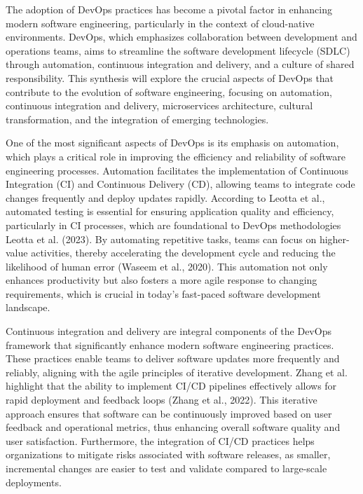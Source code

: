The adoption of DevOps practices has become a pivotal factor in enhancing modern software engineering, particularly in the context of cloud-native environments. DevOps, which emphasizes collaboration between development and operations teams, aims to streamline the software development lifecycle (SDLC) through automation, continuous integration and delivery, and a culture of shared responsibility. This synthesis will explore the crucial aspects of DevOps that contribute to the evolution of software engineering, focusing on automation, continuous integration and delivery, microservices architecture, cultural transformation, and the integration of emerging technologies.

One of the most significant aspects of DevOps is its emphasis on automation, which plays a critical role in improving the efficiency and reliability of software engineering processes. Automation facilitates the implementation of Continuous Integration (CI) and Continuous Delivery (CD), allowing teams to integrate code changes frequently and deploy updates rapidly. According to Leotta et al., automated testing is essential for ensuring application quality and efficiency, particularly in CI processes, which are foundational to DevOps methodologies Leotta et al. (2023). By automating repetitive tasks, teams can focus on higher-value activities, thereby accelerating the development cycle and reducing the likelihood of human error (Waseem et al., 2020). This automation not only enhances productivity but also fosters a more agile response to changing requirements, which is crucial in today's fast-paced software development landscape.

Continuous integration and delivery are integral components of the DevOps framework that significantly enhance modern software engineering practices. These practices enable teams to deliver software updates more frequently and reliably, aligning with the agile principles of iterative development. Zhang et al. highlight that the ability to implement CI/CD pipelines effectively allows for rapid deployment and feedback loops (Zhang et al., 2022). This iterative approach ensures that software can be continuously improved based on user feedback and operational metrics, thus enhancing overall software quality and user satisfaction. Furthermore, the integration of CI/CD practices helps organizations to mitigate risks associated with software releases, as smaller, incremental changes are easier to test and validate compared to large-scale deployments.

